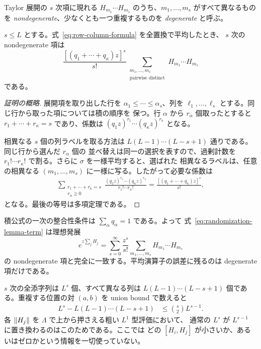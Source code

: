 \documentclass[uplatex,dvipdfmx,11pt,a4paper]{jsarticle}
\begin{document}
Taylor 展開の $s$ 次項に現れる
$H_{m_1}\cdots H_{m_s}$ のうち、$m_1,\ldots,m_s$ がすべて異なるものを
\emph{nondegenerate}、少なくとも一つ重複するものを \emph{degenerate} と呼ぶ。

\begin{lemma}
  $s\leq L$ とする。式~\eqref{eq:row-column-formula} を全置換で平均したとき、
  $s$ 次の nondegenerate 項は
  \begin{equation}
    \frac{[(q_1+\cdots+q_\kappa)z]^s}{s!}
    \sum_{\substack{m_1,\ldots,m_s\\
      \text{pairwise distinct}}}
    H_{m_1}\cdots H_{m_s}
    \label{eq:randomization-lemma-term}
  \end{equation}
  である。
\end{lemma}

\begin{proof}[証明の概略]
  展開項を取り出した行を
  $\alpha_1\leq\cdots\leq\alpha_s$、列を
  $\ell_1,\ldots,\ell_s$ とする。同じ行から取った項については積の順序を
  保つ。行 $\alpha$ から $r_\alpha$ 個取ったとすると
  $r_1+\cdots+r_\kappa=s$ であり、係数は
  $(q_1z)^{r_1}\cdots(q_\kappa z)^{r_\kappa}$ となる。

  相異なる $s$ 個の列ラベルを取る方法は
  $L(L-1)\cdots(L-s+1)$ 通りである。同じ行から選んだ $r_\alpha$ 個の
  並べ替えは同一の選択を表すので、過剰計数を
  $r_1!\cdots r_\kappa!$ で割る。さらに $\sigma$ を一様平均すると、選ばれた
  相異なるラベルは、任意の相異なる
  $(m_1,\ldots,m_s)$ に一様に写る。したがって必要な係数は
  \begin{align}
    \sum_{\substack{r_1+\cdots+r_\kappa=s\\r_\alpha\geq0}}
    \frac{(q_1z)^{r_1}\cdots(q_\kappa z)^{r_\kappa}}
    {r_1!\cdots r_\kappa!}
    =\frac{[(q_1+\cdots+q_\kappa)z]^s}{s!},
  \end{align}
  となる。最後の等号は多項定理である。
\end{proof}

積公式の一次の整合性条件は $\sum_\alpha q_\alpha=1$ である。よって
式~\eqref{eq:randomization-lemma-term} は理想発展
\begin{equation}
  e^{z\sum_jH_j}
  =\sum_{s=0}^{\infty}\frac{z^s}{s!}
    \sum_{m_1,\ldots,m_s}H_{m_1}\cdots H_{m_s}
\end{equation}
の nondegenerate 項と完全に一致する。平均演算子の誤差に残るのは
degenerate 項だけである。

$s$ 次の全添字列は $L^s$ 個、すべて異なる列は
$L(L-1)\cdots(L-s+1)$ 個である。重複する位置の対 $(a,b)$ を union bound
で数えると
\begin{align}
  L^s-L(L-1)\cdots(L-s+1)
  &\leq \binom{s}{2}L^{s-1}.
  \label{eq:degenerate-count}
\end{align}
各 $\norm{H_j}$ を $\Lambda$ で上から押さえる粗い $L^1$ 型評価において、
通常の $L^s$ が $L^{s-1}$ に置き換わるのはこのためである。ここでは
どの $[H_i,H_j]$ が小さいか、あるいはゼロかという情報を一切使っていない。
\end{document}
